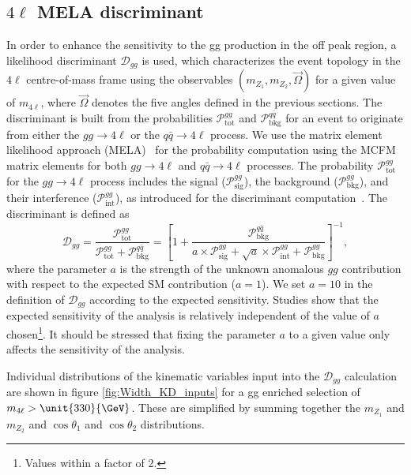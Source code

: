 \subsection{$4\ell$ MELA discriminant}
\label{sec:MELA_gg}

In order to enhance the sensitivity to the gg production in the off peak region, a likelihood discriminant
$\mathcal{D}_{gg}$ is used, which characterizes the event topology in the $4\ell$ centre-of-mass frame
using the observables $(m_{Z_1}, m_{Z_2}, \vec\Omega)$ for a given value of $m_{4\ell}$, where
$\vec\Omega$ denotes the five angles defined in the previous sections. The discriminant is built from the
probabilities $\mathcal{P}^{gg}_\text{tot}$ and $\mathcal{P}^{q\bar{q}}_\text{bkg}$
for an event to originate from either the $gg \to 4\ell$ or the $q\bar{q} \to 4\ell$
process. We use the matrix element likelihood approach (MELA)~\cite{Chatrchyan:2012ufa, Bolognesi:2012mm}
for the probability computation using the \textsc{MCFM} matrix elements for both $gg \to 4\ell$ and
$q\bar{q} \to 4\ell$ processes.
The probability $\mathcal{P}^{gg}_\text{tot}$ for the $gg \to 4\ell$ process includes
the signal ($\mathcal{P}^{gg}_\text{sig}$), the background ($\mathcal{P}^{gg}_\text{bkg}$),
and their interference ($\mathcal{P}^{gg}_\text{int}$), as introduced for the discriminant computation~\cite{Anderson:2013afp}. The discriminant is defined as
\begin{equation}
\label{eq:kd-ggmela}
\mathcal{D}_{gg} = \frac{\mathcal{P}^{gg}_\text{tot}  }{\mathcal{P}^{gg}_\text{tot}  + \mathcal{P}^{q\bar{q}}_\text{bkg} }=
\left[1+\frac{\mathcal{P}^{q\bar{q}}_\text{bkg}  }
{a \times \mathcal{P}^{gg}_\text{sig} +  \sqrt{a} \times  \mathcal{P}^{gg}_\text{int} + \mathcal{P}^{gg}_\text{bkg}  } \right]^{-1} ,
\end{equation}
where
the parameter $a$ is the strength of the unknown anomalous $gg$ contribution with respect to the
expected SM contribution ($a=1$). We set $a = 10$ in the definition of $\mathcal{D}_{gg}$ according
to the expected sensitivity. Studies show that the expected sensitivity of the analysis is relatively independent of the value of $a$ chosen\footnote{Values within a factor of 2.}. It should be stressed that fixing the parameter $a$ to
a given value only affects the sensitivity of the analysis. 

Individual distributions of the kinematic variables input into the $\mathcal{D}_{gg}$ calculation are shown in figure \ref{fig:Width_KD_inputs} for a gg enriched selection of $m_{4\ell} > \unit{330}{\GeV}$. These are simplified by summing together the $m_{Z_{1}}$ and $m_{Z_{2}}$ and $\cos\theta_{1}$ and $\cos\theta_{2}$ distributions.

